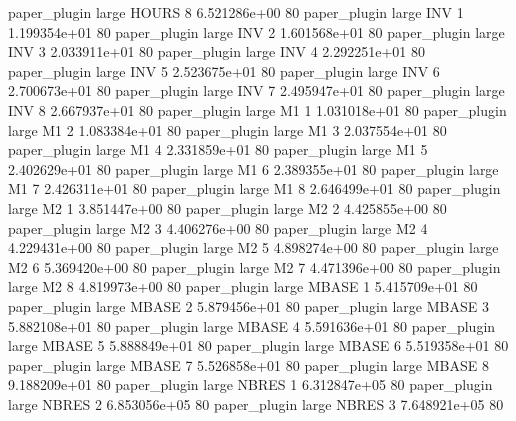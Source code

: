        paper_plugin      large    HOURS                 8 6.521286e+00 80
       paper_plugin      large      INV                 1 1.199354e+01 80
       paper_plugin      large      INV                 2 1.601568e+01 80
       paper_plugin      large      INV                 3 2.033911e+01 80
       paper_plugin      large      INV                 4 2.292251e+01 80
       paper_plugin      large      INV                 5 2.523675e+01 80
       paper_plugin      large      INV                 6 2.700673e+01 80
       paper_plugin      large      INV                 7 2.495947e+01 80
       paper_plugin      large      INV                 8 2.667937e+01 80
       paper_plugin      large       M1                 1 1.031018e+01 80
       paper_plugin      large       M1                 2 1.083384e+01 80
       paper_plugin      large       M1                 3 2.037554e+01 80
       paper_plugin      large       M1                 4 2.331859e+01 80
       paper_plugin      large       M1                 5 2.402629e+01 80
       paper_plugin      large       M1                 6 2.389355e+01 80
       paper_plugin      large       M1                 7 2.426311e+01 80
       paper_plugin      large       M1                 8 2.646499e+01 80
       paper_plugin      large       M2                 1 3.851447e+00 80
       paper_plugin      large       M2                 2 4.425855e+00 80
       paper_plugin      large       M2                 3 4.406276e+00 80
       paper_plugin      large       M2                 4 4.229431e+00 80
       paper_plugin      large       M2                 5 4.898274e+00 80
       paper_plugin      large       M2                 6 5.369420e+00 80
       paper_plugin      large       M2                 7 4.471396e+00 80
       paper_plugin      large       M2                 8 4.819973e+00 80
       paper_plugin      large    MBASE                 1 5.415709e+01 80
       paper_plugin      large    MBASE                 2 5.879456e+01 80
       paper_plugin      large    MBASE                 3 5.882108e+01 80
       paper_plugin      large    MBASE                 4 5.591636e+01 80
       paper_plugin      large    MBASE                 5 5.888849e+01 80
       paper_plugin      large    MBASE                 6 5.519358e+01 80
       paper_plugin      large    MBASE                 7 5.526858e+01 80
       paper_plugin      large    MBASE                 8 9.188209e+01 80
       paper_plugin      large    NBRES                 1 6.312847e+05 80
       paper_plugin      large    NBRES                 2 6.853056e+05 80
       paper_plugin      large    NBRES                 3 7.648921e+05 80
